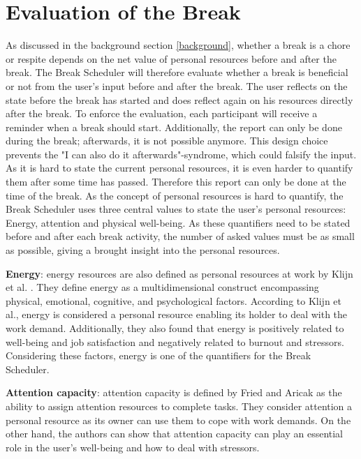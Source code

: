 \documentclass{hasel_thesis}
\begin{document}
\section{Evaluation of the Break} \label{evaluation_break}
As discussed in the background section \ref{background}, whether a break is a chore or respite depends on the net value of personal resources before and after the break. The Break Scheduler will therefore evaluate whether a break is beneficial or not from the user's input before and after the break. The user reflects on the state before the break has started and does reflect again on his resources directly after the break. To enforce the evaluation, each participant will receive a reminder when a break should start. Additionally, the report can only be done during the break; afterwards, it is not possible anymore. This design choice prevents the "I can also do it afterwards"-syndrome, which could falsify the input. As it is hard to state the current personal resources, it is even harder to quantify them after some time has passed. Therefore this report can only be done at the time of the break. As the concept of personal resources is hard to quantify, the Break Scheduler uses three central values to state the user's personal resources: Energy, attention and physical well-being. As these quantifiers need to be stated before and after each break activity, the number of asked values must be as small as possible, giving a brought insight into the personal resources. 

\textbf{Energy}: energy resources are also defined as personal resources at work by Klijn et al. \cite{klijn.2021}. They define energy as a multidimensional construct encompassing physical, emotional, cognitive, and psychological factors. According to Klijn et al., energy is considered a personal resource enabling its holder to deal with the work demand. Additionally, they also found that energy is positively related to well-being and job satisfaction and negatively related to burnout and stressors. Considering these factors, energy is one of the quantifiers for the Break Scheduler.

\textbf{Attention capacity}: attention capacity is defined by Fried and Aricak \cite{Fried2014} as the ability to assign attention resources to complete tasks. They consider attention a personal resource as its owner can use them to cope with work demands. On the other hand, the authors can show that attention capacity can play an essential role in the user's well-being and how to deal with stressors.
\end{document}
